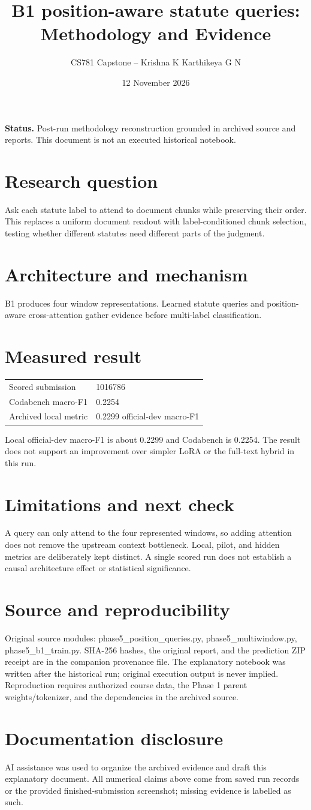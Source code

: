 \documentclass[11pt,a4paper]{article}
\title{B1 position-aware statute queries: Methodology and Evidence}
\author{CS781 Capstone -- Krishna K Karthikeya G N}
\date{12 November 2026}
\begin{document}
\maketitle
\noindent\textbf{Status.} Post-run methodology reconstruction grounded in archived source and reports. This document is not an executed historical notebook.\par
\section*{Research question}
Ask each statute label to attend to document chunks while preserving their order. This replaces a uniform document readout with label-conditioned chunk selection, testing whether different statutes need different parts of the judgment.
\section*{Architecture and mechanism}
B1 produces four window representations. Learned statute queries and position-aware cross-attention gather evidence before multi-label classification.
\section*{Measured result}
\begin{center}\begin{tabular}{ll}Scored submission & 1016786\\
Codabench macro-F1 & 0.2254\\
Archived local metric & 0.2299 official-dev macro-F1\end{tabular}\end{center}
Local official-dev macro-F1 is about 0.2299 and Codabench is 0.2254. The result does not support an improvement over simpler LoRA or the full-text hybrid in this run.
\section*{Limitations and next check}
A query can only attend to the four represented windows, so adding attention does not remove the upstream context bottleneck. Local, pilot, and hidden metrics are deliberately kept distinct. A single scored run does not establish a causal architecture effect or statistical significance.
\section*{Source and reproducibility}
Original source modules: phase5\_position\_queries.py, phase5\_multiwindow.py, phase5\_b1\_train.py. SHA-256 hashes, the original report, and the prediction ZIP receipt are in the companion provenance file. The explanatory notebook was written after the historical run; original execution output is never implied. Reproduction requires authorized course data, the Phase 1 parent weights/tokenizer, and the dependencies in the archived source.
\section*{Documentation disclosure}
AI assistance was used to organize the archived evidence and draft this explanatory document. All numerical claims above come from saved run records or the provided finished-submission screenshot; missing evidence is labelled as such.
\end{document}
